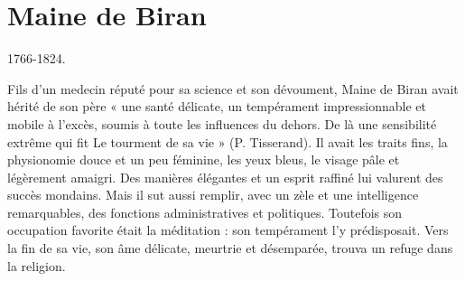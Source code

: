 
\chapter{Maine de Biran}
1766-1824.

Fils d'un medecin réputé pour sa science
et son dévoument, Maine de Biran avait
hérité de son père « une  santé délicate, un
tempérament impressionnable et
mobile à l'excès, soumis à toute les
influences du dehors. De là une sensibilité
extrême qui fit Le tourment de sa
vie » (P. Tisserand). Il avait les traits
fins, la physionomie douce et un peu
féminine, les yeux bleus, le visage pâle
et légèrement amaigri. Des manières
élégantes et un esprit raffiné lui valurent
des succès mondains. Mais il sut aussi
remplir, avec un zèle et une intelligence
remarquables, des fonctions administratives
et politiques. Toutefois son occupation
favorite était la méditation : son
tempérament l'y prédisposait. Vers la
fin de sa vie, son âme délicate, meurtrie
et désemparée, trouva un refuge dans la religion.


